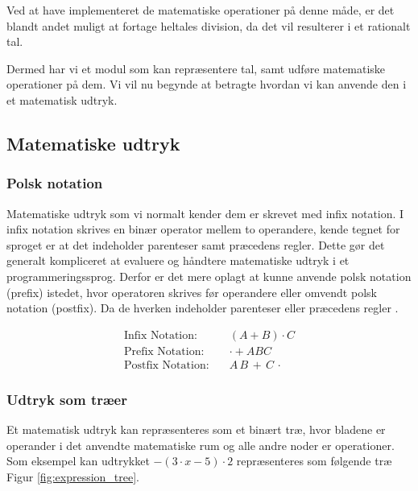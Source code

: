 Ved at have implementeret de matematiske operationer på denne måde, er det blandt andet muligt at fortage heltales division, da det vil resulterer i et rationalt tal.

Dermed har vi et modul som kan repræsentere tal, samt udføre matematiske operationer på dem. Vi vil nu begynde at betragte hvordan vi kan anvende den i et matematisk udtryk.

\subsection{Matematiske udtryk}
\subsubsection{Polsk notation}
Matematiske udtryk som vi normalt kender dem er skrevet med infix notation. I infix notation skrives en binær operator mellem to operandere, kende tegnet for sproget er at det indeholder parenteser samt præcedens regler. Dette gør det generalt kompliceret at evaluere og håndtere matematiske udtryk i et programmeringssprog. Derfor er det mere oplagt at kunne anvende polsk notation (prefix) istedet, hvor operatoren skrives før operandere eller omvendt polsk notation (postfix). Da de hverken indeholder parenteser eller præcedens regler . 

\begin{align*}
    \text{Infix Notation:} \quad & (A + B) \cdot C \\
    \text{Prefix Notation:} \quad &  \cdot + A B C  \\
    \text{Postfix Notation:} \quad & A \, B \, + \, C \, \cdot
\end{align*}

 

\subsubsection{Udtryk som træer} \label{sec:expression_as_trees}
Et matematisk udtryk kan repræsenteres som et binært træ, hvor bladene er operander i det anvendte matematiske rum og alle andre noder er operationer. Som eksempel kan udtrykket $-(3 \cdot x - 5) \cdot 2$ repræsenteres som følgende træ Figur \ref{fig:expression_tree}. 


